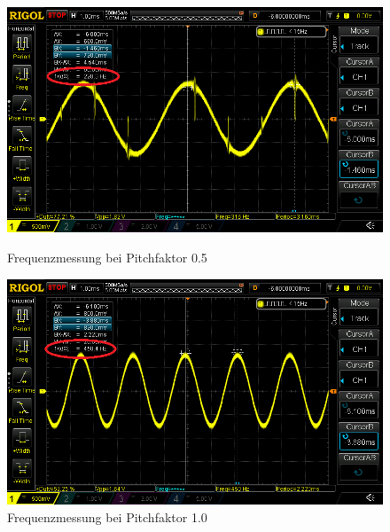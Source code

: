 \begin{figure}[H]
	\centering
	\begin{minipage}[b]{0.49\textwidth}
		\centering
		\includegraphics[width=\textwidth]{images/10_test_validierung/audio/440Hz-pitch_0.5.png}
		\caption{Frequenzmessung bei Pitchfaktor 0.5}
		\label{fig:440Hz-pitch_0.5}
	\end{minipage}
	\hfill
	\begin{minipage}[b]{0.49\textwidth}
		\centering
		\includegraphics[width=\textwidth]{images/10_test_validierung/audio/440Hz-pitch_1.0.png}
		\caption{Frequenzmessung bei Pitchfaktor 1.0}
		\label{fig:440Hz-pitch_1.0}
	\end{minipage}
	
	\vspace{1em}
	

\end{figure}
